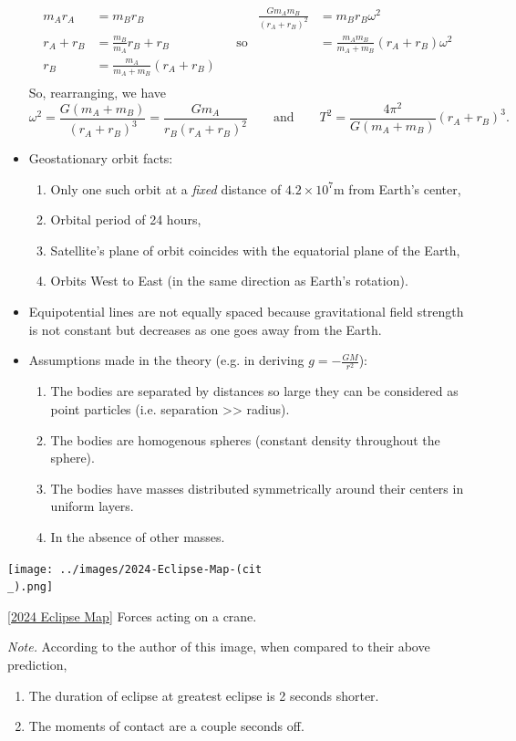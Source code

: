\documentclass[oneside]{book}
\begin{document}
\begin{itemize}[label=\(\square\)]
\begin{align*}
    m_Ar_A&=m_Br_B& && \frac{Gm_Am_B}{(r_A+r_B)^2}&=m_Br_B\omega^2\\
    r_A+r_B&=\frac{m_B}{m_A}r_B+r_B& &\text{so}& &=\frac{m_Am_B}{m_A+m_B}(r_A+r_B)\omega^2\\
    r_B&=\frac{m_A}{m_A+m_B}(r_A+r_B)& && &\\
\end{align*}
So, rearranging, we have
\[\omega^2=\frac{G(m_A+m_B)}{(r_A+r_B)^3}=\frac{Gm_A}{r_B(r_A+r_B)^2} \qquad\text{and}\qquad T^2=\frac{4\pi^2}{G(m_A+m_B)}(r_A+r_B)^3.\]
\item Geostationary orbit facts:
\begin{enumerate}
    \item Only one such orbit at a \emph{fixed} distance of \(4.2\times10^7\text{m}\) from Earth's center,
    \item Orbital period of 24 hours,
    \item Satellite's plane of orbit coincides with the equatorial plane of the Earth,
    \item Orbits West to East (in the same direction as Earth's rotation). 
\end{enumerate}
\item Equipotential lines are not equally spaced because gravitational field strength is not constant but decreases as one goes away from the Earth.
\item Assumptions made in the theory (e.g. in deriving \(g=-\frac{GM}{r^2}\)):
\begin{enumerate}
    \item The bodies are separated by distances so large they can be considered as point particles (i.e. separation >> radius).
    \item The bodies are homogenous spheres (constant density throughout the sphere).
    \item The bodies have masses distributed symmetrically around their centers in uniform layers.
    \item In the absence of other masses.
\end{enumerate}
\end{itemize}
\begin{center}
    \texttt{[image: ../images/2024-Eclipse-Map-(cit\\\_).png]}
    \captionsetup{type=figure}
    \caption[figure]{\ref{2024 Eclipse Map} Forces acting on a crane.}
\end{center}
\emph{Note.} According to the author of this image, when compared to their above prediction,
\begin{enumerate}
    \item The duration of eclipse at greatest eclipse is 2 seconds shorter.
    \item The moments of contact are a couple seconds off.
\end{enumerate}
\end{document}
